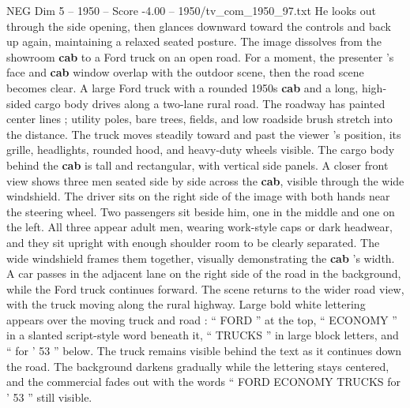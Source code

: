 \begin{textsample}{NEG Dim 5 – 1950 – Score -4.00 – 1950/tv\_com\_1950\_97.txt}
He looks out through the side opening, then glances downward toward the controls and back up again, maintaining a relaxed seated posture.
The image dissolves from the showroom \textbf{cab} to a Ford truck on an open road.
For a moment, the presenter ’s face and \textbf{cab} window overlap with the outdoor scene, then the road scene becomes clear.
A large Ford truck with a rounded 1950s \textbf{cab} and a long, high-sided cargo body drives along a two-lane rural road.
The roadway has painted center lines ; utility poles, bare trees, fields, and low roadside brush stretch into the distance.
The truck moves steadily toward and past the viewer ’s position, its grille, headlights, rounded hood, and heavy-duty wheels visible.
The cargo body behind the \textbf{cab} is tall and rectangular, with vertical side panels.
A closer front view shows three men seated side by side across the \textbf{cab}, visible through the wide windshield.
The driver sits on the right side of the image with both hands near the steering wheel.
Two passengers sit beside him, one in the middle and one on the left.
All three appear adult men, wearing work-style caps or dark headwear, and they sit upright with enough shoulder room to be clearly separated.
The wide windshield frames them together, visually demonstrating the \textbf{cab} ’s width.
A car passes in the adjacent lane on the right side of the road in the background, while the Ford truck continues forward.
The scene returns to the wider road view, with the truck moving along the rural highway.
Large bold white lettering appears over the moving truck and road : “ FORD ” at the top, “ ECONOMY ” in a slanted script-style word beneath it, “ TRUCKS ” in large block letters, and “ for ’ 53 ” below.
The truck remains visible behind the text as it continues down the road.
The background darkens gradually while the lettering stays centered, and the commercial fades out with the words “ FORD ECONOMY TRUCKS for ’ 53 ” still visible.

\end{textsample}
